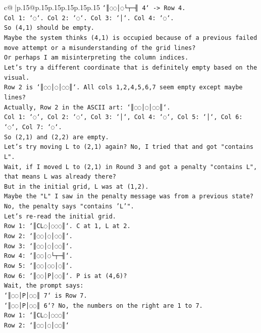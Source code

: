 \documentclass{article}
\begin{document}
{\begin{supertabular}{c@{$\;$}|p{.15\linewidth}@{}p{.15\linewidth}p{.15\linewidth}p{.15\linewidth}p{.15\linewidth}p{.15\linewidth}}
{{{\texttt{`║◌◌│◌└┬─╢ 4` {-}> Row 4.} \\
\texttt{Col 1: `◌`. Col 2: `◌`. Col 3: `│`. Col 4: `◌`.} \\
\texttt{So (4,1) should be empty.} \\
\texttt{Maybe the system thinks (4,1) is occupied because of a previous failed move attempt or a misunderstanding of the grid lines?} \\
\texttt{Or perhaps I am misinterpreting the column indices.} \\
\texttt{Let's try a different coordinate that is definitely empty based on the visual.} \\
\texttt{Row 2 is `║◌◌│◌│◌◌║`. All cols 1,2,4,5,6,7 seem empty except maybe lines?} \\
\texttt{Actually, Row 2 in the ASCII art: `║◌◌│◌│◌◌║`.} \\
\texttt{Col 1: `◌`, Col 2: `◌`, Col 3: `│`, Col 4: `◌`, Col 5: `│`, Col 6: `◌`, Col 7: `◌`.} \\
\texttt{So (2,1) and (2,2) are empty.} \\
\texttt{Let's try moving L to (2,1) again? No, I tried that and got "contains L".} \\
\texttt{Wait, if I moved L to (2,1) in Round 3 and got a penalty "contains L", that means L was already there?} \\
\texttt{But in the initial grid, L was at (1,2).} \\
\texttt{Maybe the "L" I saw in the penalty message was from a previous state?} \\
\texttt{No, the penalty says "contains 'L'".} \\
\texttt{Let's re{-}read the initial grid.} \\
\texttt{Row 1: `║CL◌│◌◌◌║`. C at 1, L at 2.} \\
\texttt{Row 2: `║◌◌│◌│◌◌║`.} \\
\texttt{Row 3: `║◌◌│◌│◌◌║`.} \\
\texttt{Row 4: `║◌◌│◌└┬─╢`.} \\
\texttt{Row 5: `║◌◌│◌◌│◌║`.} \\
\texttt{Row 6: `║◌◌│P│◌◌║`. P is at (4,6)?} \\
\texttt{Wait, the prompt says:} \\
\texttt{`║◌◌│P│◌◌║ 7` is Row 7.} \\
\texttt{`║◌◌│P│◌◌║ 6`? No, the numbers on the right are 1 to 7.} \\
\texttt{Row 1: `║CL◌│◌◌◌║`} \\
\texttt{Row 2: `║◌◌│◌│◌◌║`} \\
}}}
\end{supertabular}}
\end{document}
